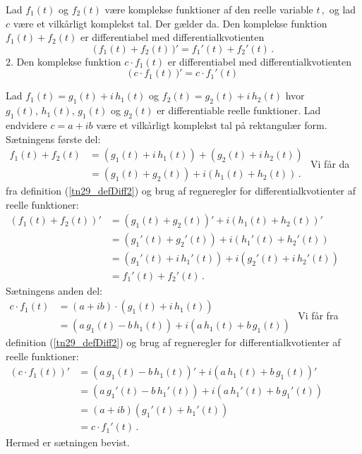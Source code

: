 \begin{theorem}\label{tn29_regnDiff}
Lad $f_1(t)$ og $f_2(t)$ være komplekse funktioner af den reelle variable $t\,,$ og lad $c$ være et vilkårligt komplekst tal. Der gælder da. Den komplekse funktion $f_1(t)+f_2(t)$ er differentiabel med differentialkvotienten 
\begin{equation}
\big (\,f_1(t)+f_2(t)\,)'=f_1'(t)+f_2'(t)\,.
\end{equation}
2. Den komplekse funktion $c\cdot f_1(t)$ er differentiabel med differentialkvotienten 
\begin{equation}
\big (\,c\cdot f_1(t)\,\big)'=c\cdot f_1'(t)
\end{equation}
\end{theorem}

\begin{bevis}
Lad $f_1(t)=g_1(t)+i\,h_1(t)$ og $f_2(t)=g_2(t)+i\,h_2(t)$ hvor $g_1(t),\,h_1(t),\,g_1(t)$ og $g_2(t)$ er differentiable reelle funktioner. Lad endvidere $c=a+ib$ være et vilkårligt komplekst tal på rektangulær form.\bs
Sætningens første del:\\
$
\begin{aligned}
f_1(t)+f_2(t)&=\left(g_1(t)+i\,h_1(t)\right)+\left(g_2(t)+i\,h_2(t)\right)\\
&=\left(g_1(t)+g_2(t)\right)+i\left(h_1(t)+h_2(t)\right)\,.
\end{aligned}
$\bs
Vi får da fra definition (\ref{tn29_defDiff2}) og brug af regneregler for differentialkvotienter af reelle funktioner:\bs
$
\begin{aligned}
\left(f_1(t)+f_2(t)\right)'&=\left(g_1(t)+g_2(t)\right)'+i\left(h_1(t)+h_2(t)\right)'\\
&=\left(g_1'(t)+g_2'(t)\right)+i\left(h_1'(t)+h_2'(t)\right)\\
&=\left(g_1'(t)+i\,h_1'(t)\right)+i\left(g_2'(t)+i\,h_2'(t)\right)\\
&=f_1'(t)+f_2'(t)\,.
\end{aligned}
$\bs
Sætningens anden del:\\
$
\begin{aligned}
c\cdot f_1(t)&=(a+ib)\cdot\left(g_1(t)+i\,h_1(t)\right)\\
&=\left(a\,g_1(t)-b\,h_1(t)\right)+i\left(a\,h_1(t)+b\,g_1(t)\right)
\end{aligned}
$\bs
Vi får fra definition (\ref{tn29_defDiff2}) og brug af regneregler for differentialkvotienter af reelle funktioner:\bs
$
\begin{aligned}
\left(c\cdot f_1(t)\right)'&=\left(a\,g_1(t)-b\,h_1(t)\right)'+i\left(a\,h_1(t)+b\,g_1(t)\right)'\\
&=\left(a\,g_1'(t)-b\,h_1'(t)\right)+i\left(a\,h_1'(t)+b\,g_1'(t)\right)\\
&=(a+ib)\left(g_1'(t)+h_1'(t)\right)\\
&=c\cdot f_1'(t)\,.
\end{aligned}
$\bs
Hermed er sætningen bevist.
\end{bevis}

